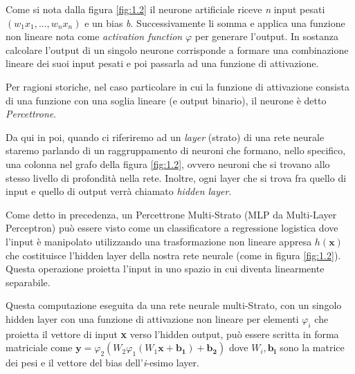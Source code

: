 Come si nota dalla figura \ref{fig:1.2} il neurone artificiale riceve \emph{n} input pesati $(w_1x_1,...,w_nx_n)$ e un bias \emph{b}. Successivamente li somma e applica una funzione non lineare nota come \textit{activation function} $\varphi$ per generare l'output. In sostanza calcolare l'output di un singolo neurone corrisponde a formare una combinazione lineare dei suoi input pesati e poi passarla ad una funzione di attivazione.

Per ragioni storiche, nel caso particolare in cui la funzione di attivazione consista di una funzione con una soglia lineare (e output binario), il neurone è detto \textit{Percettrone}.

Da qui in poi, quando ci riferiremo ad un \textit{layer} (strato) di una rete neurale staremo parlando di un raggruppamento di neuroni che formano, nello specifico, una colonna nel grafo della figura \ref{fig:1.2}, ovvero neuroni che si trovano allo stesso livello di profondità nella rete. Inoltre, ogni layer che si trova fra quello di input e quello di output verrà chiamato \textit{hidden layer}.

Come detto in precedenza, un Percettrone Multi-Strato (MLP da Multi-Layer Perceptron) può essere visto come un classificatore a regressione logistica dove l'input è manipolato utilizzando una trasformazione non lineare appresa $h(\boldsymbol{x})$ che costituisce l'hidden layer della nostra rete neurale (come in figura \ref{fig:1.2}). Questa operazione proietta l'input in uno spazio in cui diventa linearmente separabile.

Questa computazione eseguita da una rete neurale multi-Strato, con un singolo hidden layer con una funzione di attivazione non lineare per elementi $\varphi_i$ che proietta il vettore di input \textbf{x} verso l'hidden output, può essere scritta in forma matriciale come $\boldsymbol{y} = \varphi_2(W_2\varphi_1(W_1\boldsymbol{x} + \boldsymbol{b_1}) + \boldsymbol{b_2})$ dove $W_i, \boldsymbol{b_i}$ sono la matrice dei pesi e il vettore del bias dell'\textit{i}-esimo layer.

